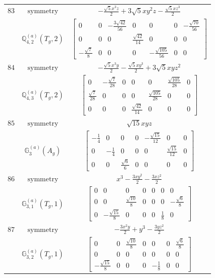 \documentclass[fleqn,8pt,landscape]{jsarticle}
\begin{document}
\begin{longtable}{ccc}
$ 83 $ & $ \text{symmetry} $ & $ - \frac{\sqrt{5} x^{3} z}{2} + 3 \sqrt{5} x y^{2} z - \frac{\sqrt{5} x z^{3}}{2} $ \\
$  $ & $ \mathbb{Q}_{4,2}^{(a)}(T_{g},2) $ & $ \begin{bmatrix} 0 & 0 & - \frac{3 \sqrt{42}}{56} & 0 & 0 & 0 & - \frac{\sqrt{70}}{56} \\ 0 & 0 & 0 & \frac{\sqrt{42}}{14} & 0 & 0 & 0 \\ - \frac{\sqrt{7}}{8} & 0 & 0 & 0 & - \frac{\sqrt{105}}{56} & 0 & 0 \end{bmatrix} $ \\ \hline
$ 84 $ & $ \text{symmetry} $ & $ - \frac{\sqrt{5} x^{3} y}{2} - \frac{\sqrt{5} x y^{3}}{2} + 3 \sqrt{5} x y z^{2} $ \\
$  $ & $ \mathbb{Q}_{4,3}^{(a)}(T_{g},2) $ & $ \begin{bmatrix} 0 & - \frac{\sqrt{7}}{28} & 0 & 0 & 0 & \frac{\sqrt{105}}{28} & 0 \\ \frac{\sqrt{7}}{28} & 0 & 0 & 0 & \frac{\sqrt{105}}{28} & 0 & 0 \\ 0 & 0 & 0 & \frac{\sqrt{42}}{14} & 0 & 0 & 0 \end{bmatrix} $ \\ \hline
$ 85 $ & $ \text{symmetry} $ & $ \sqrt{15} x y z $ \\
$  $ & $ \mathbb{G}_{3}^{(a)}(A_{g}) $ & $ \begin{bmatrix} - \frac{1}{4} & 0 & 0 & 0 & - \frac{\sqrt{15}}{12} & 0 & 0 \\ 0 & - \frac{1}{4} & 0 & 0 & 0 & \frac{\sqrt{15}}{12} & 0 \\ 0 & 0 & \frac{\sqrt{6}}{6} & 0 & 0 & 0 & 0 \end{bmatrix} $ \\ \hline
$ 86 $ & $ \text{symmetry} $ & $ x^{3} - \frac{3 x y^{2}}{2} - \frac{3 x z^{2}}{2} $ \\
$  $ & $ \mathbb{G}_{3,1}^{(a)}(T_{g},1) $ & $ \begin{bmatrix} 0 & 0 & 0 & 0 & 0 & 0 & 0 \\ 0 & 0 & \frac{\sqrt{10}}{8} & 0 & 0 & 0 & - \frac{\sqrt{6}}{8} \\ 0 & - \frac{\sqrt{15}}{8} & 0 & 0 & 0 & \frac{1}{8} & 0 \end{bmatrix} $ \\ \hline
$ 87 $ & $ \text{symmetry} $ & $ - \frac{3 x^{2} y}{2} + y^{3} - \frac{3 y z^{2}}{2} $ \\
$  $ & $ \mathbb{G}_{3,2}^{(a)}(T_{g},1) $ & $ \begin{bmatrix} 0 & 0 & \frac{\sqrt{10}}{8} & 0 & 0 & 0 & \frac{\sqrt{6}}{8} \\ 0 & 0 & 0 & 0 & 0 & 0 & 0 \\ - \frac{\sqrt{15}}{8} & 0 & 0 & 0 & - \frac{1}{8} & 0 & 0 \end{bmatrix} $ \\ \hline

\end{longtable}
\end{document}
